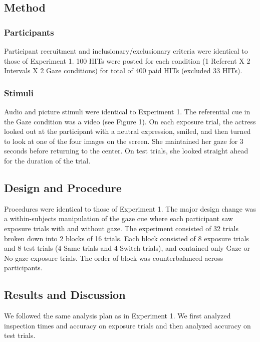 \documentclass[authoryear, review]{elsarticle}
\begin{document}
\subsection{Method}\label{method-1}

\subsubsection{Participants}\label{participants-1}

Participant recruitment and inclusionary/exclusionary criteria were
identical to those of Experiment 1. 100 HITs were posted for each
condition (1 Referent X 2 Intervals X 2 Gaze conditions) for total of
400 paid HITs (excluded 33 HITs).

\subsubsection{Stimuli}\label{stimuli-1}

Audio and picture stimuli were identical to Experiment 1. The
referential cue in the Gaze condition was a video (see Figure 1). On
each exposure trial, the actress looked out at the participant with a
neutral expression, smiled, and then turned to look at one of the four
images on the screen. She maintained her gaze for 3 seconds before
returning to the center. On test trials, she looked straight ahead for
the duration of the trial.

\subsection{Design and Procedure}\label{design-and-procedure-1}

Procedures were identical to those of Experiment 1. The major design
change was a within-subjects manipulation of the gaze cue where each
participant saw exposure trials with and without gaze. The experiment
consisted of 32 trials broken down into 2 blocks of 16 trials. Each
block consisted of 8 exposure trials and 8 test trials (4 Same trials
and 4 Switch trials), and contained only Gaze or No-gaze exposure
trials. The order of block was counterbalanced across participants.

\subsection{Results and Discussion}\label{results-and-discussion-1}

We followed the same analysis plan as in Experiment 1. We first analyzed
inspection times and accuracy on exposure trials and then analyzed
accuracy on test trials.
\end{document}
